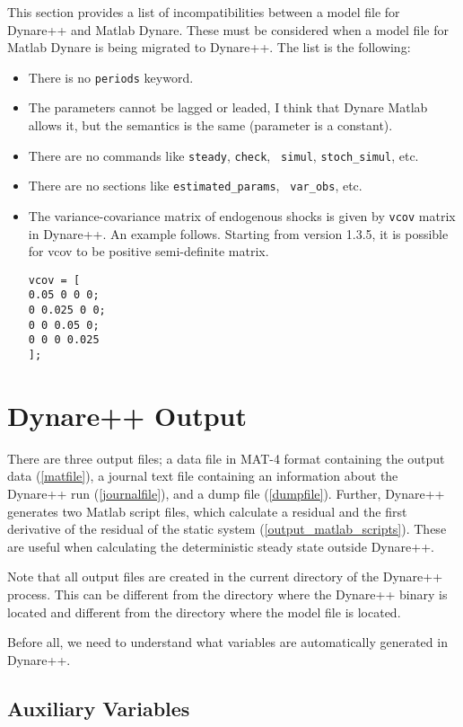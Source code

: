 \documentclass[10pt]{article}
\begin{document}
This section provides a list of incompatibilities between a model file
for Dy\-na\-re++ and Matlab Dynare. These must be considered when a model
file for Matlab Dynare is being migrated to Dynare++. The list is the
following:
\begin{itemize}
\item There is no {\tt periods} keyword.
\item The parameters cannot be lagged or leaded, I think that Dynare
Matlab allows it, but the semantics is the same (parameter is a
constant).
\item There are no commands like {\tt steady}, {\tt check}, {\tt
simul}, {\tt stoch\_simul}, etc.
\item There are no sections like {\tt estimated\_params}, {\tt
var\_obs}, etc.
\item The variance-covariance matrix of endogenous shocks is given by
{\tt vcov} matrix in Dynare++. An example follows. Starting from
version 1.3.5, it is possible for vcov to be positive semi-definite
matrix.
{\small
\begin{verbatim}
vcov = [
0.05 0 0 0;
0 0.025 0 0;
0 0 0.05 0;
0 0 0 0.025
];
\end{verbatim}
}

\end{itemize}

\section{Dynare++ Output}

There are three output files; a data file in MAT-4 format containing
the output data (\ref{matfile}), a journal text file containing an
information about the Dynare++ run (\ref{journalfile}), and a dump
file (\ref{dumpfile}). Further, Dynare++ generates two Matlab script
files, which calculate a residual and the first derivative of the
residual of the static system (\ref{output_matlab_scripts}). These are
useful when calculating the deterministic steady state outside
Dynare++.

Note that all output files are created in the current directory of
the Dynare++ process. This can be different from the directory where
the Dynare++ binary is located and different from the directory where
the model file is located.

Before all, we need to understand what variables are automatically
generated in Dynare++.

\subsection{Auxiliary Variables}
\label{aux_var}
\end{document}
